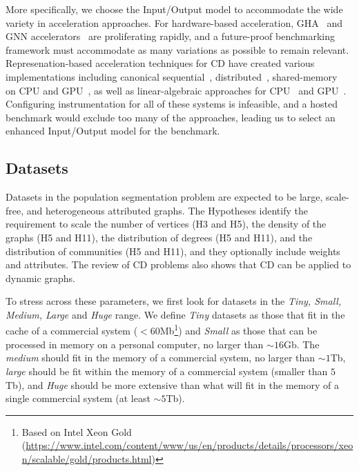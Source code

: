 More specifically, we choose the Input/Output model to accommodate the wide variety in \gai acceleration approaches.
For hardware-based acceleration, \ac{GHA}~\cite{Aananthakrishnan2020, Fu2014, Wang2016, Sundaram2015, Liu2019, Wu2015, Zhang2023, Dadu2021, Chen2020, Song2016, Ham2016, Dysart2016} and \ac{GNN} accelerators~\cite{Wu2021a, Baruah2021, Zhang2023, Kiningham2022, Yan2020, Lin2023, Zhang2023b, Lin2024, Zhu2023, Zhong2023, Zhang2023a, Chen2023, Abi2023} are proliferating rapidly, and a future-proof benchmarking framework must accommodate as many variations as possible to remain relevant.
% 
Represenation-based acceleration techniques for \ac{CD} have created various implementations including canonical sequential~\cite{Blondel2008}, distributed~\cite{Ghosh2018}, shared-memory~\cite{Ghosh2019} on \ac{CPU} and \ac{GPU}~\cite{Wang2016}, as well as linear-algebraic approaches for \ac{CPU}~\cite{Low2020} and \ac{GPU}~\cite{Mattson2019}.
Configuring instrumentation for all of these systems is infeasible, and a hosted benchmark would exclude too many of the approaches, leading us to select an enhanced Input/Output model for the benchmark. 

\subsection{Datasets}
Datasets in the \gai population segmentation problem are expected to be large, scale-free, and heterogeneous attributed graphs.
The Hypotheses identify the requirement to scale the number of vertices (H3 and H5), the density of the graphs (H5 and H11), the distribution of degrees (H5 and H11), and the distribution of communities (H5 and H11), and they optionally include weights and attributes. 
The review of \ac{CD} problems also shows that \ac{CD} can be applied to dynamic graphs.

To stress across these parameters, we first look for datasets in the \textit{Tiny, Small, Medium, Large} and \textit{Huge} range. 
We define \textit{Tiny} datasets as those that fit in the cache of a commercial system ($<60$Mb\footnote{\scriptsize{Based on Intel Xeon Gold (\url{https://www.intel.com/content/www/us/en/products/details/processors/xeon/scalable/gold/products.html}})}) and \textit{Small} as those that can be processed in memory on a personal computer, no larger than $\sim16$Gb.
The \textit{medium} should fit in the memory of a commercial system, no larger than $\sim1$Tb, \textit{large} should be fit within the memory of a commercial system (smaller than $5$Tb), and \textit{Huge} should be more extensive than what will fit in the memory of a single commercial system (at least $\sim5$Tb).

